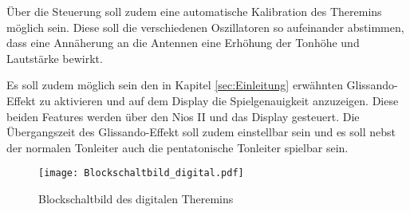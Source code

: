 Über die Steuerung soll zudem eine automatische Kalibration des Theremins möglich sein. Diese soll die verschiedenen Oszillatoren so aufeinander abstimmen, dass eine Annäherung an die Antennen eine Erhöhung der Tonhöhe und Lautstärke bewirkt.

Es soll zudem möglich sein den in Kapitel \ref{sec:Einleitung} erwähnten Glissando-Effekt zu aktivieren und auf dem Display die Spielgenauigkeit anzuzeigen. Diese beiden Features werden über den Nios II und das Display gesteuert. Die Übergangszeit des Glissando-Effekt soll zudem einstellbar sein und es soll nebst der normalen Tonleiter auch die pentatonische Tonleiter spielbar sein.

\begin{figure}[h]
	\centering
	\texttt{[image: Blockschaltbild\_digital.pdf]}
	\caption{Blockschaltbild des digitalen Theremins}
	\label{img:Blockschaltbild_digital}
\end{figure}